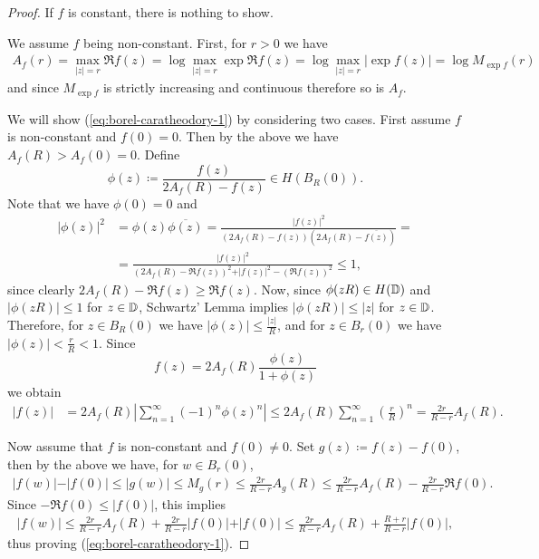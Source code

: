 \begin{proof}
    If $f$ is constant, there is nothing to show.

    We assume $f$ being non-constant. First, for $r > 0$ we have
    \begin{align*}
        A_f(r) = \max_{\vert z \vert = r} \Re f(z) = \log \max_{\vert z \vert = r} \exp {\Re f(z)} = \log \max_{\vert z \vert = r} \vert \exp f(z) \vert = \log M_{\exp f}(r)
    \end{align*}
    and since $M_{\exp f}$ is strictly increasing and continuous therefore so is $A_f$.

    We will show (\ref{eq:borel-caratheodory-1}) by considering two cases. First assume $f$ is non-constant and $f(0) = 0$. Then by the above we have $A_f(R) > A_f(0) = 0$. Define
    \begin{equation*}
        \phi(z) \coloneqq \frac{f(z)}{2 A_f(R) - f(z)} \in H(B_R(0)).
    \end{equation*}
    Note that we have $\phi(0) = 0$ and
    \begin{align*}
        \vert \phi(z) \vert^2 &= \phi(z) \overline{\phi(z)} = \frac{\vert f(z) \vert^2}{(2 A_f(R) - f(z))(2 A_f(R) - \overline{f(z)})} = \\
        &= \frac{\vert f(z) \vert^2}{(2 A_f(R) - \Re f(z))^2 + \vert f(z) \vert^2 - (\Re f(z))^2} \leq 1,
    \end{align*}
    since clearly $2 A_f(R) - \Re f(z) \geq \Re f(z)$. Now, since $\phi(zR) \in H(\mathbb{D})$ and $\vert \phi(zR) \vert \leq 1$ for $z \in \mathbb{D}$, Schwartz' Lemma implies $\vert \phi(zR) \vert \leq \vert z \vert$ for $z \in \mathbb{D}$. Therefore, for $z \in B_R(0)$ we have $\vert \phi (z) \vert \leq \frac{\vert z \vert}{R}$, and for $z \in B_r(0)$ we have $\vert \phi (z) \vert < \frac{r}{R} < 1$. Since
    \begin{equation*}
        f(z) = 2 A_f(R) \frac{\phi(z)}{1 + \phi(z)}
    \end{equation*}
    we obtain
    \begin{align*}
        \vert f(z) \vert &= 2 A_f(R) \left\vert \sum_{n=1}^\infty (-1)^n \phi(z)^n \right\vert \leq 2 A_f(R) \sum_{n=1}^\infty \left( \frac{r}{R} \right)^n = \frac{2 r}{R - r} A_f(R).
    \end{align*}

    Now assume that $f$ is non-constant and $f(0) \neq 0$. Set $g(z) \coloneqq f(z) - f(0)$, then by the above we have, for $w \in B_r(0)$,
    \begin{align*}
        \vert f(w) \vert - \vert f(0) \vert \leq \vert g(w) \vert \leq M_g(r) \leq \frac{2 r}{R - r} A_g(R) \leq \frac{2r}{R - r} A_f(R) - \frac{2r}{R - r} \Re f(0).
    \end{align*}
    Since $-\Re f(0) \leq \vert f(0) \vert$, this implies
    \begin{align*}
        \vert f(w) \vert \leq \frac{2r}{R - r}A_f(R) + \frac{2r}{R - r} \vert f(0) \vert + \vert f(0) \vert \leq \frac{2r}{R - r} A_f(R) + \frac{R + r}{R - r} \vert f(0) \vert,
    \end{align*}
    thus proving (\ref{eq:borel-caratheodory-1}).


\end{proof}
